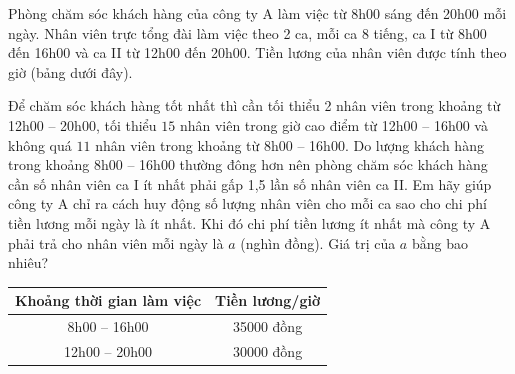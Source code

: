 \begin{ex}
Phòng chăm sóc khách hàng của công ty A làm việc từ 8h00 sáng đến 20h00 mỗi ngày. Nhân viên trực tổng đài làm việc theo 2 ca, mỗi ca 8 tiếng, ca I từ 8h00 đến 16h00 và ca II từ 12h00 đến 20h00. Tiền lương của nhân viên được tính theo giờ (bảng dưới đây).

Để chăm sóc khách hàng tốt nhất thì cần tối thiểu 2 nhân viên trong khoảng từ 12h00 -- 20h00, tối thiểu ${15}$ nhân viên trong giờ cao điểm từ 12h00 -- 16h00 và không quá ${11}$ nhân viên trong khoảng từ 8h00 -- 16h00. Do lượng khách hàng trong khoảng 8h00 -- 16h00 thường đông hơn nên phòng chăm sóc khách hàng cần số nhân viên ca I ít nhất phải gấp 1,5 lần số nhân viên ca II. Em hãy giúp công ty A chỉ ra cách huy động số lượng nhân viên cho mỗi ca sao cho chi phí tiền lương mỗi ngày là ít nhất. Khi đó chi phí tiền lương ít nhất mà công ty A phải trả cho nhân viên mỗi ngày là ${a}$ (nghìn đồng). Giá trị của ${a}$ bằng bao nhiêu?

\begin{center}
\begin{tabular}{|c|c|}
\hline
\textbf{Khoảng thời gian làm việc} & \textbf{Tiền lương/giờ} \\
\hline
8h00 -- 16h00 & 35000 đồng \\
\hline
12h00 -- 20h00 & 30000 đồng \\
\hline
\end{tabular}
\end{center}

\end{ex}

